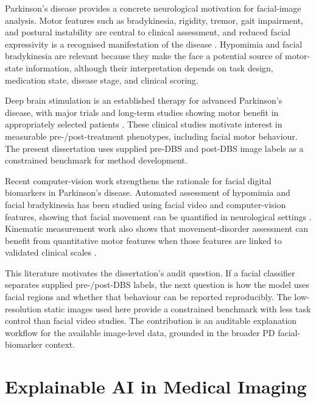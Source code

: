 Parkinson's disease provides a concrete neurological motivation for facial-image analysis. Motor features such as bradykinesia, rigidity, tremor, gait impairment, and postural instability are central to clinical assessment, and reduced facial expressivity is a recognised manifestation of the disease  . Hypomimia and facial bradykinesia are relevant because they make the face a potential source of motor-state information, although their interpretation depends on task design, medication state, disease stage, and clinical scoring.


Deep brain stimulation is an established therapy for advanced Parkinson's disease, with major trials and long-term studies showing motor benefit in appropriately selected patients   . These clinical studies motivate interest in measurable pre-/post-treatment phenotypes, including facial motor behaviour. The present dissertation uses supplied pre-DBS and post-DBS image labels as a constrained benchmark for method development.


Recent computer-vision work strengthens the rationale for facial digital biomarkers in Parkinson's disease. Automated assessment of hypomimia and facial bradykinesia has been studied using facial video and computer-vision features, showing that facial movement can be quantified in neurological settings  . Kinematic measurement work also shows that movement-disorder assessment can benefit from quantitative motor features when those features are linked to validated clinical scales .


This literature motivates the dissertation's audit question. If a facial classifier separates supplied pre-/post-DBS labels, the next question is how the model uses facial regions and whether that behaviour can be reported reproducibly. The low-resolution static images used here provide a constrained benchmark with less task control than facial video studies. The contribution is an auditable explanation workflow for the available image-level data, grounded in the broader PD facial-biomarker context.


\section{Explainable AI in Medical Imaging}

